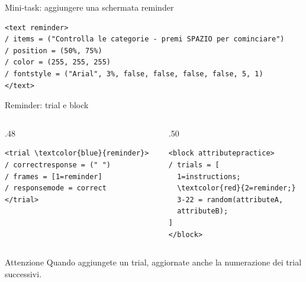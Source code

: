 \documentclass[compress]{beamer}
\begin{document}
\begin{frame}[fragile]{Mini-task: aggiungere una schermata reminder}
\centering
{}

\vspace{5mm}
\begin{small}
\begin{Verbatim}[commandchars=\\\{\}]
<text reminder>
/ items = ("Controlla le categorie - premi SPAZIO per cominciare")
/ position = (50%, 75%)
/ color = (255, 255, 255)
/ fontstyle = ("Arial", 3%, false, false, false, false, 5, 1)
</text>
\end{Verbatim}
\end{small}
\end{frame}

\begin{frame}[fragile]{Reminder: trial e block}
\begin{columns}[T]
\begin{column}{.48\linewidth}
\begin{small}
\begin{Verbatim}[commandchars=\\\{\}]
<trial \textcolor{blue}{reminder}>
/ correctresponse = (" ")
/ frames = [1=reminder]
/ responsemode = correct
</trial>
\end{Verbatim}
\end{small}
\end{column}
\begin{column}{.50\linewidth}
\begin{small}
\begin{Verbatim}[commandchars=\\\{\}]
<block attributepractice>
/ trials = [
  1=instructions;
  \textcolor{red}{2=reminder;}
  3-22 = random(attributeA, 
  attributeB);
]
</block>
\end{Verbatim}
\end{small}
\end{column}
\end{columns}

\vspace{3mm}
\begin{alertblock}{Attenzione}
Quando aggiungete un trial, aggiornate anche la numerazione dei trial successivi.
\end{alertblock}
\end{frame}
\end{document}
